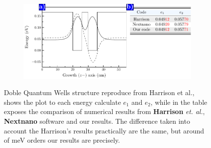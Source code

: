 \begin{figure}[htb!]
	\centering
	\begin{subfigure}{\textwidth}
	\includegraphics[width=\textwidth]{../figures/chapter-2/numerical-calculations/out/harrison-wells}
	\label{subfig:chapter-2-sec-numerical-comparison-harrison-plot-a}
	\label{subfig:chapter-2-sec-numerical-comparison-harrison-table-b}
	\end{subfigure}
	\caption{Doble Quantum Wells structure reproduce from  Harrison et al.\cite{harrison2016chap3},  shows the plot to each energy calculate $e_{1}$ and $e_{2}$, while in  the table exposes the comparison of  numerical results from \textbf{Harrison} \textit{et. al.}, \textbf{Nextnano} software \cite{Nextnanoharrison} and our results. The difference taken into account the Harrison's results practically are the same, but around of meV orders our results are precisely.  }
	\label{fig:chapter-2-sec-numerical-calculations-harrison-wells}
\end{figure}
